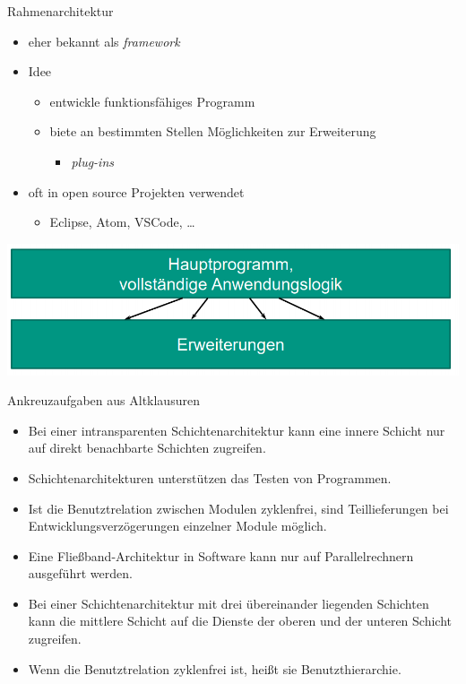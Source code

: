 \documentclass[18pt]{beamer}
\newcommand{\cmark}{\ding{51}}%
\newcommand{\xmark}{\ding{55}}%
\newcommand{\correct}{\textcolor{green}{\cmark}}
\newcommand{\ncorrect}{\textcolor{red}{\xmark}}
\begin{document}
\begin{frame}{Rahmenarchitektur}
	\begin{itemize}
		\item eher bekannt als \emph{framework}
		\item Idee 
		\begin{itemize}
			\item entwickle funktionsfähiges Programm
			\item biete an bestimmten Stellen Möglichkeiten zur Erweiterung
			\begin{itemize}
				\item \emph{plug-ins}
			\end{itemize}
		\end{itemize}
		\item oft in open source Projekten verwendet
		\begin{itemize}
			\item Eclipse, Atom, VSCode, \dots
		\end{itemize}
	\end{itemize}
	\centering \includegraphics[scale=0.4]{pics/tut3/framework.png}
\end{frame}

\begin{frame}{Ankreuzaufgaben aus Altklausuren}
	\begin{itemize}
		\item Bei einer intransparenten Schichtenarchitektur kann eine innere Schicht nur auf direkt benachbarte Schichten zugreifen. \pause \ncorrect
		\item Schichtenarchitekturen unterstützen das Testen von Programmen. \pause \correct
		\item Ist die Benutztrelation zwischen Modulen zyklenfrei, sind Teillieferungen bei Entwicklungsverzögerungen einzelner Module möglich. \pause \correct
		\item Eine Fließband-Architektur in Software kann nur auf Parallelrechnern ausgeführt werden. \pause \correct
		\item Bei einer Schichtenarchitektur mit drei übereinander liegenden Schichten kann die mittlere Schicht auf die Dienste der oberen und der unteren Schicht zugreifen. \pause \ncorrect
		\item Wenn die Benutztrelation zyklenfrei ist, heißt sie Benutzthierarchie. \pause \correct
	\end{itemize}
\end{frame}
\end{document}
